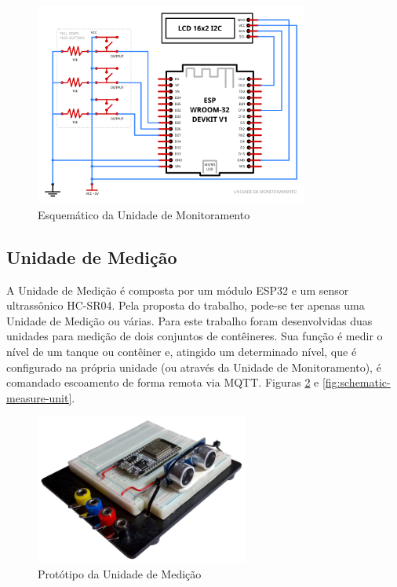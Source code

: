 \begin{figure}[h!]
    \centering
    \includegraphics[width=9cm]{imagem/diagrama-unidade-monitoramento.png}
    \caption{Esquemático da Unidade de Monitoramento}
    \label{fig:schematic-monitoring-unit}
\end{figure}

\subsection{Unidade de Medição}
A Unidade de Medição é composta por um módulo ESP32 e um sensor ultrassônico HC-SR04. Pela proposta do trabalho, pode-se ter apenas uma Unidade de Medição ou várias. Para este trabalho foram desenvolvidas duas unidades para medição de dois conjuntos de contêineres. Sua função é medir o nível de um tanque ou contêiner e, atingido um determinado nível, que é configurado na própria unidade (ou através da Unidade de Monitoramento), é comandado escoamento de forma remota via MQTT. Figuras \ref{fig:photo-measure-unit} e \ref{fig:schematic-measure-unit}.

\begin{figure}[h!]
    \centering
    \includegraphics[width=7cm]{imagem/unidade-medicao.png}
    \caption{Protótipo da Unidade de Medição}
    \label{fig:photo-measure-unit}
\end{figure}


